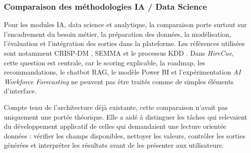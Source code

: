 \subsubsection{Comparaison des méthodologies IA / Data Science}

Pour les modules IA, data science et analytique, la comparaison porte surtout sur l'encadrement du besoin métier, la préparation des données, la modélisation, l'évaluation et l'intégration des sorties dans la plateforme. Les références utilisées sont notamment CRISP-DM \cite{crispdm}, SEMMA \cite{sas_semma} et le processus KDD \cite{fayyad_kdd}. Dans \textit{HireCue}, cette question est centrale, car le scoring explicable, la roadmap, les recommandations, le chatbot RAG, le modèle Power BI et l'expérimentation \textit{AI Workforce Forecasting} ne peuvent pas être traités comme de simples éléments d'interface.

Compte tenu de l'architecture déjà existante, cette comparaison n'avait pas uniquement une portée théorique. Elle a aidé à distinguer les tâches qui relevaient du développement applicatif de celles qui demandaient une lecture orientée données : vérifier les champs disponibles, nettoyer les valeurs, contrôler les sorties générées et interpréter les résultats avant de les présenter aux utilisateurs.

